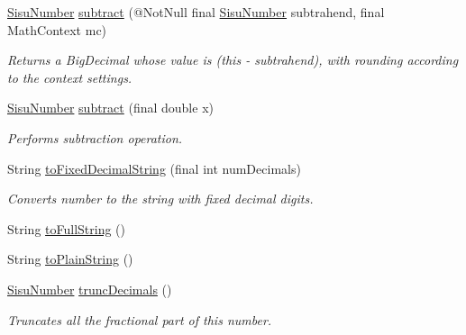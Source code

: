 \begin{DoxyCompactItemize}
\hyperlink{classcom_1_1aarrelaakso_1_1drawl_1_1_sisu_number}{Sisu\+Number} \hyperlink{classcom_1_1aarrelaakso_1_1drawl_1_1_sisu_number_aec3ddec2b485920d5fe75707f40793e8}{subtract} (@Not\+Null final \hyperlink{classcom_1_1aarrelaakso_1_1drawl_1_1_sisu_number}{Sisu\+Number} subtrahend, final Math\+Context mc)
\begin{DoxyCompactList}\small\item\em Returns a Big\+Decimal whose value is (this -\/ subtrahend), with rounding according to the context settings. \end{DoxyCompactList}\item 
\hyperlink{classcom_1_1aarrelaakso_1_1drawl_1_1_sisu_number}{Sisu\+Number} \hyperlink{classcom_1_1aarrelaakso_1_1drawl_1_1_sisu_number_ab152fb0010ff0cee6a4f94a157c58a02}{subtract} (final double x)
\begin{DoxyCompactList}\small\item\em Performs subtraction operation. \end{DoxyCompactList}\item 
String \hyperlink{classcom_1_1aarrelaakso_1_1drawl_1_1_sisu_number_a487c37a577a8b4a52e86832a32bc303d}{to\+Fixed\+Decimal\+String} (final int num\+Decimals)
\begin{DoxyCompactList}\small\item\em Converts number to the string with fixed decimal digits. \end{DoxyCompactList}\item 
String \hyperlink{classcom_1_1aarrelaakso_1_1drawl_1_1_sisu_number_af92a070f5f79dbd684b2c1b8cf423c6f}{to\+Full\+String} ()
\item 
String \hyperlink{classcom_1_1aarrelaakso_1_1drawl_1_1_sisu_number_af5251e6a7d1f5ed6762394384f2ec604}{to\+Plain\+String} ()
\item 
\hyperlink{classcom_1_1aarrelaakso_1_1drawl_1_1_sisu_number}{Sisu\+Number} \hyperlink{classcom_1_1aarrelaakso_1_1drawl_1_1_sisu_number_ad237bd3a51bc78b3e8cf78d53c1d09c9}{trunc\+Decimals} ()
\begin{DoxyCompactList}\small\item\em Truncates all the fractional part of this number. \end{DoxyCompactList}\end{DoxyCompactItemize}

